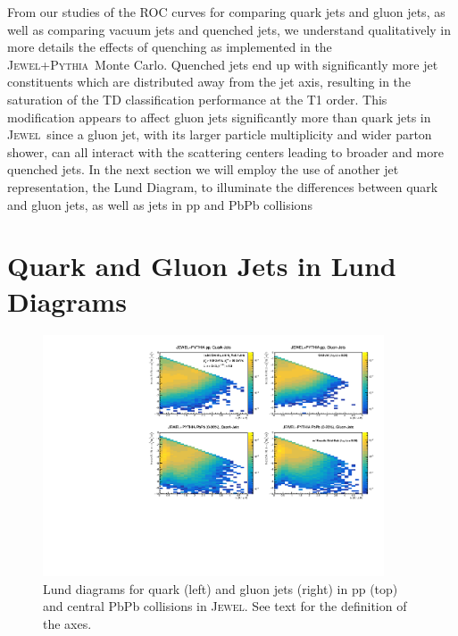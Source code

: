 \documentclass[notoc]{JHEP3}
\newcommand{\jw}{\textsc{Jewel}~}
\newcommand{\jwpy}{\textsc{Jewel+Pythia}~}
\begin{document}
From our studies of the ROC curves for comparing quark jets and gluon jets, as well as comparing vacuum jets and quenched jets, we understand qualitatively in more details the effects of quenching as implemented in the \jwpy Monte Carlo. Quenched jets end up with significantly more jet constituents which are distributed away from the jet axis, resulting in the saturation of the TD classification performance at the T1 order. This modification appears to affect gluon jets significantly more than quark jets in \jw since a gluon jet, with its larger particle multiplicity and wider parton shower, can all interact with the scattering centers leading to broader and more quenched jets. In the next section we will employ the use of another jet representation, the Lund Diagram, to illuminate the differences between quark and gluon jets, as well as jets in pp and PbPb collisions

\section{Quark and Gluon Jets in Lund Diagrams}
\label{sec:lund}

\begin{figure}[t]
	\centering
	\includegraphics[width=0.9\textwidth]{plots/Individual_LundDiagrams_zrel.pdf}
	\caption{Lund diagrams for quark (left) and gluon jets (right) in pp (top) and central PbPb collisions in \textsc{Jewel}. See text for the definition of the axes.}
\label{fig:Lund_full}
\end{figure}
\end{document}
